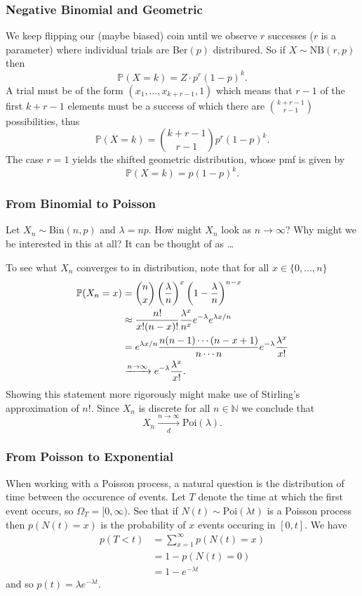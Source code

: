 \documentclass[11pt]{article}
\begin{document}
\begin{appendices}
\subsubsection{Negative Binomial and Geometric}
We keep flipping our (maybe biased) coin until we observe $r$ successes ($r$ is a parameter) where individual trials are Ber$(p)$ distribured. So if $X\sim\text{NB}(r,p)$ then
$$
\mathbb{P}(X=k)
=
Z\cdot p^r(1-p)^k.
$$
A trial must be of the form $(x_1,\dots,x_{k+r-1},1)$ which means that $r-1$ of the first $k+r-1$ elements must be a success of which there are $\binom{k+r-1}{r-1}$ possibilities, thus
$$
\mathbb{P}(X=k)
=
\binom{k+r-1}{r-1}p^r(1-p)^k.
$$
The case $r=1$ yields the shifted geometric distribution, whose pmf is given by
$$
\mathbb{P}(X=k)
=
p(1-p)^k.
$$

\subsubsection{From Binomial to Poisson}
Let $X_n\sim\text{Bin}(n,p)$ and $\lambda=np$. How might $X_n$ look as $n\to\infty$? Why might we be interested in this at all? It can be thought of as \dots

To see what $X_n$ converges to in distribution, note that for all $x\in\{0,\dots,n\}$
\begin{align*}
    \mathbb{P}(X_n=x)
    &=
    \binom{n}{x}\left(\frac{\lambda}{n}\right)^x\left(1-\frac{\lambda}{n}\right)^{n-x}\\
    &\approx
    \frac{n!}{x!(n-x)!}\frac{\lambda^x}{n^x}e^{-\lambda}e^{\lambda x/n}\\
    &=
    e^{\lambda x/n}\frac{n(n-1)\cdots(n-x+1)}{n\cdots n}e^{-\lambda}\frac{\lambda^x}{x!}\\
    & \xrightarrow{n\to\infty}
    e^{-\lambda}\frac{\lambda^x}{x!}.
\end{align*}
Showing this statement more rigorously might make use of Stirling's approximation of $n!$. Since $X_n$ is discrete for all $n\in\mathbb{N}$ we conclude that
$$
X_n
\xrightarrow[d]{n\to\infty}
\text{Poi}(\lambda).
$$

\subsubsection{From Poisson to Exponential}
When working with a Poisson process, a natural question is the distribution of time between the occurence of events. Let $T$ denote the time at which the first event occurs, so $\Omega_T=[0,\infty)$. See that if $N(t)\sim\text{Poi}(\lambda t)$ is a Poisson process then $p(N(t)=x)$ is the probability of $x$ events occuring in $[0,t]$. We have
\begin{align*}
    p(T<t)
    &=
    \sum_{x=1}^{\infty}p(N(t)=x)\\
    &=
    1-p(N(t)=0)\\
    &=
    1-e^{-\lambda t}
\end{align*}
and so
$p(t)=\lambda e^{-\lambda t}$.


\end{appendices}
\end{document}
